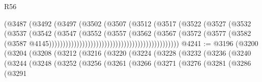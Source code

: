 \begin{lexlean}{R56}
\begin{coremodule}
                                                        (@3487
                                                          (@3492
                                                            (@3497
                                                              (@3502
                                                                (@3507
                                                                  (@3512
                                                                    (@3517
                                                                      (@3522
                                                                        (@3527
                                                                          (@3532
                                                                            (@3537
                                                                              (@3542
                                                                                (@3547
                                                                                  (@3552
                                                                                    (@3557
                                                                                      (@3562
                                                                                        (@3567
                                                                                          (@3572
                                                                                            (@3577
                                                                                              (@3582
                                                                                                (@3587
                                                                                                  @4145)))))))))))))))))))))))))))))))))))))))))))))))
@4241 := @3196
    (@3200
      (@3204
        (@3208
          (@3212
            (@3216
              (@3220
                (@3224
                  (@3228
                    (@3232
                      (@3236
                        (@3240
                          (@3244
                            (@3248
                              (@3252
                                (@3256
                                  (@3261
                                    (@3266
                                      (@3271
                                        (@3276
                                          (@3281
                                            (@3286
                                              (@3291

\end{coremodule}
\end{lexlean}

